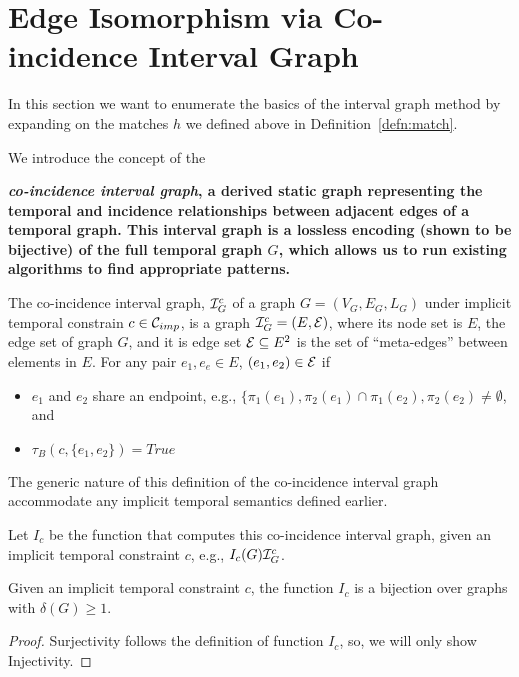 \section{Edge Isomorphism via Co-incidence Interval Graph}

In this section we want to enumerate the basics of the interval graph method by
expanding on the matches $h$ we defined above in Definition~\ref{defn:match}. 

We introduce the concept of the {\bf {\em co-incidence
interval graph}, a derived static graph representing the temporal and incidence
relationships between adjacent edges of a temporal graph. This interval graph is a
lossless encoding (shown to be bijective) of the full temporal graph $G$, which
allows us to run existing algorithms to find appropriate patterns.  

 

\begin{defn}
  \label{def:ci_graph}
  The co-incidence interval graph, $\mathcal{I}_G^c$ of a graph $G = (V_G,E_G, L_G)$ under
  implicit temporal constrain $c \in \mathcal{C}_{imp}$, is a graph $\mathcal{I}_G^c = (E, \mathcal{E})$, where its 
  node set is $E$,  the edge set of  graph $G$,  and it is edge set $\mathcal{E} \subseteq E^2$ is
  the set of ``meta-edges'' between elements in $E$. For any pair $e_1, e_e \in E$, 
  $(e_1,e_2) \in \mathcal{E}$ if  
  \begin{itemize}
    \item $e_1$ and $e_2$ share an endpoint, e.g., $\{\pi_1(e_1), \pi_2(e_1) 
    	\cap \pi_1(e_2), \pi_2(e_2) \not= \emptyset$,  and
    \item $\tau_B(c,\{e_1,e_2\}) = True$
  \end{itemize}
\end{defn}

The generic nature of this definition of the co-incidence interval graph accommodate any 
implicit temporal semantics defined earlier.



 Let $I_c$ be the function that computes this co-incidence interval graph, given an implicit temporal constraint $c$, e.g., $I_c(G) \mathcal{I}_G^c$.

\begin{lemma}
  \label{lem:ci_biject}
  Given an implicit temporal constraint $c$, the function $I_c$ is a bijection over
  graphs with $\delta(G) \geq 1$.
\end{lemma}

\begin{proof}[Proof] Surjectivity follows the definition of function $I_c$, so,   we will only show Injectivity.
  

\end{proof}}
